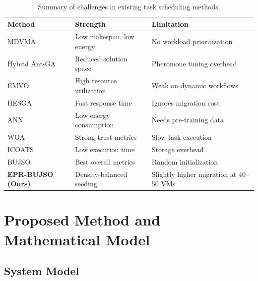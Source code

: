 \documentclass[journal]{IEEEtran}
\begin{document}
\begin{table}[h!]
\centering
\caption{Summary of challenges in existing task scheduling methods.}
\label{tab:related}
\small
\begin{tabular}{p{2.5cm}p{3.4cm}p{5.2cm}}
\toprule
\textbf{Method} & \textbf{Strength} & \textbf{Limitation} \\
\midrule
MDVMA~\cite{alsadie2021}       & Low makespan, low energy   & No workload prioritization \\
Hybrid Ant-GA~\cite{ajmal2021} & Reduced solution space     & Pheromone tuning overhead  \\
EMVO~\cite{shukri2021}         & High resource utilization  & Weak on dynamic workflows  \\
HESGA~\cite{velliangiri2021}   & Fast response time         & Ignores migration cost     \\
ANN~\cite{sharma2020}          & Low energy consumption     & Needs pre-training data    \\
WOA~\cite{mangalampalli2023}   & Strong trust metrics       & Slow task execution        \\
ICOATS~\cite{tamilarasu2023}   & Low execution time         & Storage overhead           \\
BUJSO~\cite{pachipala2024}     & Best overall metrics       & Random initialization      \\
\textbf{EPR-BUJSO (Ours)}      & Density-balanced seeding   & Slightly higher migration at 40--50 VMs \\
\bottomrule
\end{tabular}
\end{table}

\section{Proposed Method and Mathematical Model}
\label{sec:proposed}

\subsection{System Model}
\end{document}
